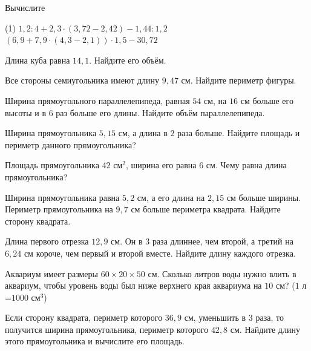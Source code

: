 \begin{class}[number=6]
	\begin{listofex}
		\item Вычислите \begin{tasks}(1)
			\task \( 1,2:4+2,3\cdot(3,72-2,42)-1,44:1,2 \) 
			\task \( (6,9+7,9\cdot(4,3-2,1))\cdot1,5-30,72 \) 
		\end{tasks}  
		\item Длина куба равна \( 14,1 \). Найдите его объём.
		\item Все стороны семиугольника имеют длину \( 9,47 \) см. Найдите периметр фигуры.
		\item Ширина прямоугольного параллелепипеда, равная \( 54 \) см, на \( 16 \) см больше его высоты и в \( 6 \) раз больше его длины. Найдите объём параллелепипеда.
		\item Ширина прямоугольника \( 5,15 \) см, а длина в \( 2 \) раза больше. Найдите площадь и периметр данного прямоугольника?
		\item Площадь прямоугольника \( 42 \) см\( ^{2} \), ширина его равна \( 6 \) см. Чему равна длина прямоугольника?
		\item Ширина прямоугольника равна \( 5,2 \) см, а его длина на \( 2,15 \) см больше ширины. Периметр прямоугольника на \( 9,7 \) см больше периметра квадрата. Найдите сторону квадрата.
		\item Длина первого отрезка \( 12,9 \) см. Он в \( 3 \) раза длиннее, чем второй, а третий на \( 6,24 \) см короче, чем первый и второй вместе. Найдите длину каждого отрезка.
		\item Аквариум имеет размеры \( 60\times20\times50 \) см. Сколько литров воды нужно влить в аквариум, чтобы уровень воды был ниже верхнего края аквариума на \( 10 \) см? (\( 1 \) л =\( 1000 \) см\( ^3 \))
		\item Если сторону квадрата, периметр которого \( 36,9 \) см, уменьшить в 3 раза, то получится ширина прямоугольника, периметр которого \( 42,8 \) см. Найдите длину этого прямоугольника и вычислите его площадь.
	\end{listofex}
\end{class}

